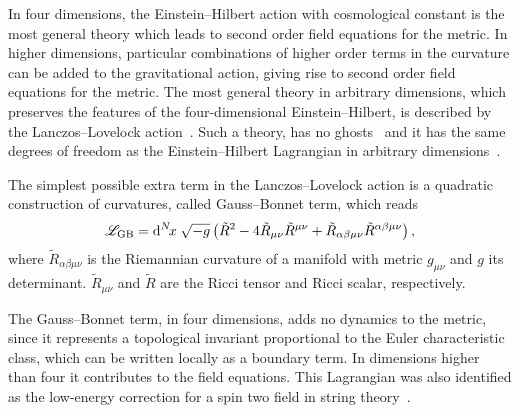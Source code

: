 \documentclass[aps,prd,12pt,superscriptaddress,showpacs,showkeys,longbibliography,reprint,nofootinbib]{revtex4-1}
\begin{document}
In four dimensions, the Einstein--Hilbert action with cosmological constant is the most general theory which leads to second order field equations for the metric. In higher dimensions, particular combinations of higher order terms in the curvature can be added to the gravitational action, giving rise to second order field equations for the metric. The most general theory in arbitrary dimensions, which preserves the features of the four-dimensional Einstein--Hilbert, is described by the Lanczos--Lovelock action~\cite{Lanczos:1938sf,Lovelock:1971yv}. Such a theory, has no ghosts~\cite{Zumino:1985dp} and it has the same degrees of freedom as the Einstein--Hilbert Lagrangian in arbitrary dimensions~\cite{Henneaux:1990au}.

The simplest possible extra term in the Lanczos--Lovelock action  is a quadratic construction of curvatures, called Gauss--Bonnet term, which reads
\begin{equation}\label{GB}
  \mathcal{L}_{\mathrm{GB}} = {\mathrm{d}}^{N}\!{x}\;\sqrt{-g}\left(\tilde{R}^2-4\tilde{R}_{\mu\nu}\tilde{R}^{\mu\nu}+\tilde{R}_{\alpha\beta\mu\nu}
  \tilde{R}^{\alpha\beta\mu\nu}\right),
\end{equation}
where $\tilde{R}_{\alpha\beta\mu\nu}$ is the Riemannian curvature of a manifold with metric $g_{\mu\nu}$ and $g$ its determinant. $\tilde{R}_{\mu\nu}$ and $\tilde{R}$ are the Ricci tensor and Ricci scalar, respectively.

The Gauss--Bonnet term, in four dimensions, adds no dynamics to the metric, since it represents a topological invariant proportional to the Euler characteristic class, which can be written locally as a boundary term. In dimensions higher than four it contributes to the field equations.
This Lagrangian was also identified as the low-energy correction for a spin two field in string theory~\cite{Zwiebach:1985uq}.
\end{document}
